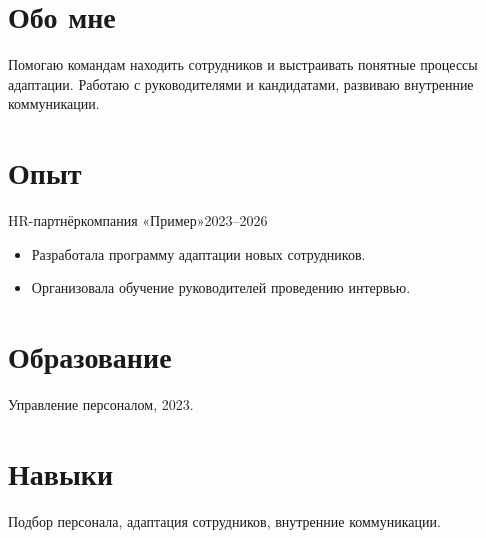 \documentclass[margin,line]{resume}
\begin{document}
\begin{resume}
  \section{\mysidestyle Обо мне}
  Помогаю командам находить сотрудников и выстраивать понятные процессы
  адаптации. Работаю с руководителями и кандидатами, развиваю внутренние
  коммуникации.

  \section{\mysidestyle Опыт}
  \begin{resumeentry}{HR-партнёр}{компания «Пример»}{2023--2026}
  \begin{itemize}
    \item Разработала программу адаптации новых сотрудников.
    \item Организовала обучение руководителей проведению интервью.
  \end{itemize}
  \end{resumeentry}

  \section{\mysidestyle Образование}
  Управление персоналом, 2023.

  \section{\mysidestyle Навыки}
  Подбор персонала, адаптация сотрудников, внутренние коммуникации.
\end{resume}
\end{document}

